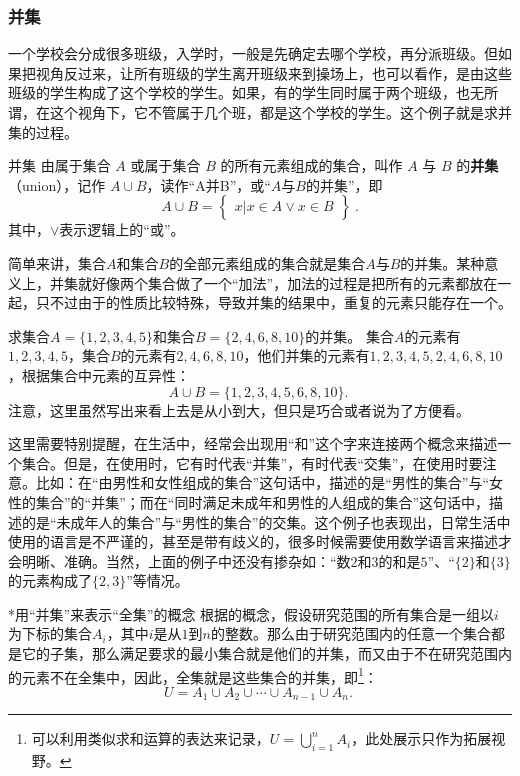 \subsubsection{并集}

一个学校会分成很多班级，入学时，一般是先确定去哪个学校，再分派班级。但如果把视角反过来，让所有班级的学生离开班级来到操场上，也可以看作，是由这些班级的学生构成了这个学校的学生。如果，有的学生同时属于两个班级，也无所谓，在这个视角下，它不管属于几个班，都是这个学校的学生。这个例子就是求并集的过程。

\begin{definition}{并集}
由属于集合 $A$ 或属于集合 $B$ 的所有元素组成的集合，叫作 $A$ 与 $B$ 的\textbf{并集}（union），记作 $A\cup B$，读作“A并B”，或“$A$与$B$的并集”，即
\begin{equation}
A\cup B = \begin{Bmatrix}x|x\in A \lor x\in B\end{Bmatrix}~.
\end{equation}
其中，$\lor$表示逻辑上的“或”。
\end{definition}
简单来讲，集合$A$和集合$B$的全部元素组成的集合就是集合$A$与$B$的并集。某种意义上，并集就好像两个集合做了一个“加法”，加法的过程是把所有的元素都放在一起，只不过由于的性质比较特殊，导致并集的结果中，重复的元素只能存在一个。

\begin{example}{求集合$A=\{1,2,3,4,5\}$和集合$B=\{2,4,6,8,10\}$的并集。}\label{ex_HsSeOp_1}
集合$A$的元素有$1,2,3,4,5$，集合$B$的元素有$2,4,6,8,10$，他们并集的元素有$1,2,3,4,5,2,4,6,8,10$，根据集合中元素的互异性：
$$
A\cup B=\{1,2,3,4,5,6,8,10\}.~
$$
注意，这里虽然写出来看上去是从小到大，但只是巧合或者说为了方便看。
\end{example}

这里需要特别提醒，在生活中，经常会出现用“和”这个字来连接两个概念来描述一个集合。但是，在使用时，它有时代表“并集”，有时代表“交集”，在使用时要注意。比如：在“由男性和女性组成的集合”这句话中，描述的是“男性的集合”与“女性的集合”的“并集”；而在“同时满足未成年和男性的人组成的集合”这句话中，描述的是“未成年人的集合”与“男性的集合”的交集。这个例子也表现出，日常生活中使用的语言是不严谨的，甚至是带有歧义的，很多时候需要使用数学语言来描述才会明晰、准确。当然，上面的例子中还没有掺杂如：“数$2$和$3$的和是$5$”、“$\{2\}$和$\{3\}$的元素构成了$\{2,3\}$”等情况。

\begin{example}{*用“并集”来表示“全集”的概念}
根据的概念，假设研究范围的所有集合是一组以$i$为下标的集合$A_i$，其中$i$是从$1$到$n$的整数。那么由于研究范围内的任意一个集合都是它的子集，那么满足要求的最小集合就是他们的并集，而又由于不在研究范围内的元素不在全集中，因此，全集就是这些集合的并集，即\footnote{可以利用类似求和运算的表达来记录，$\displaystyle U=\bigcup_{i=1}^n A_i$，此处展示只作为拓展视野。}：
$$
U=A_1\cup A_2\cup \cdots \cup A_{n-1}\cup A_n.~
$$
\end{example}


